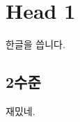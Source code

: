 \documentclass[]{article}
\date{}
\begin{document}
\section{Head 1}\label{head-1}

한글을 씁니다.

\subsection{2수준}\label{uxc218uxc900}

재밌네.
\end{document}
